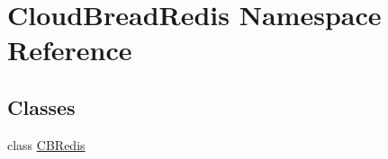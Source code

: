 \hypertarget{a00225}{}\section{Cloud\+Bread\+Redis Namespace Reference}
\label{a00225}
\subsection*{Classes}
\begin{DoxyCompactItemize}
\item 
class \hyperlink{a00030}{C\+B\+Redis}
\end{DoxyCompactItemize}

